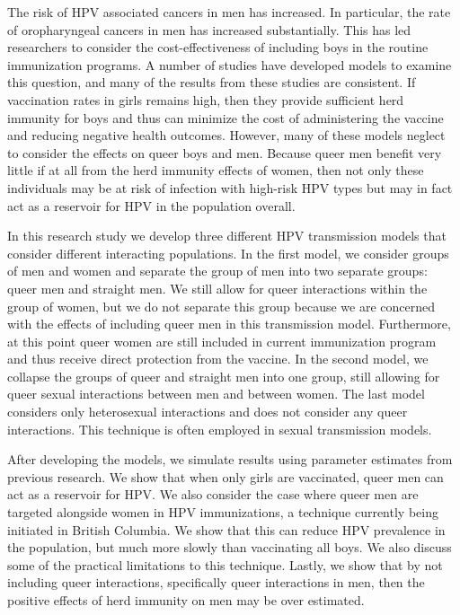 \documentclass[12pt]{article}
\begin{document}
The risk of HPV associated cancers in men has increased. In particular, the rate of oropharyngeal cancers in men has increased substantially.  This has led researchers to consider the cost-effectiveness of including boys in the routine immunization programs.  A number of studies have developed models to examine this question, and many of the results from these studies are consistent.  If vaccination rates in girls remains high, then they provide sufficient herd immunity for boys and thus can minimize the cost of administering the vaccine and reducing negative health outcomes.  However, many of these models neglect to consider the effects on queer boys and men.  Because queer men benefit very little if at all from the herd immunity effects of women, then not only these individuals may be at risk of infection with high-risk HPV types but may in fact act as a reservoir for HPV in the population overall.  

In this research study we develop three different HPV transmission models that consider different interacting populations.  In the first model, we consider groups of men and women and separate the group of men into two separate groups: queer men and straight men.  We still allow for queer interactions within the group of women, but we do not separate this group because we are concerned with the effects of including queer men in this transmission model.  Furthermore, at this point queer women are still included in current immunization program and thus receive direct protection from the vaccine. In the second model, we collapse the groups of queer and straight men into one group, still allowing for queer sexual interactions between men and between women.  The last model considers only heterosexual interactions and does not consider any queer interactions.  This technique is often employed in sexual transmission models.

After developing the models, we simulate results using parameter estimates from previous research.  We show that when only girls are vaccinated, queer men can act as a reservoir for HPV.  We also consider the case where queer men are targeted alongside women in HPV immunizations, a technique currently being initiated in British Columbia.  We show that this can reduce HPV prevalence in the population, but much more slowly than vaccinating all boys.  We also discuss some of the practical limitations to this technique.  Lastly, we show that by not including queer interactions, specifically queer interactions in men, then the positive effects of herd immunity on men may be over estimated. 
\end{document}
